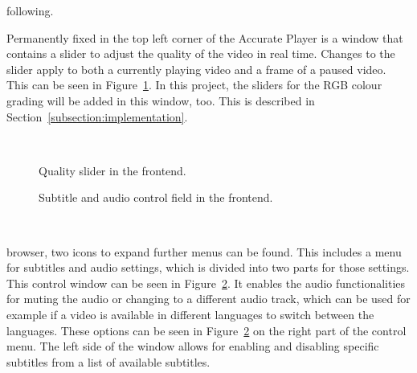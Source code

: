 \documentclass[../MasterThesis.tex]{subfiles}
\begin{document}
\begin{minipage}{0.5\textwidth}
%	
\vspace*{0.7em}
following.

	
Permanently fixed in the top left corner of the Accurate Player is a window that contains a slider to adjust the quality of the video in real time. Changes to the slider apply to both a currently playing video and a frame of a paused video. This can be seen in Figure~\ref{figure:qualityslider}. 
In this project, the sliders for the RGB colour grading will be added in this window, too. This is described in Section~\ref{subsection:implementation}.

\end{minipage}\begin{minipage}{0.05\textwidth}
	\ 
\end{minipage}\begin{minipage}{0.45\textwidth}
	
\begin{figure}[H]
	\begin{center}
		\caption[Quality slider in the frontend.]{Quality slider in the frontend.}
		\label{figure:qualityslider} 
	\end{center}
\end{figure}
\end{minipage}

\vspace*{0.2em}

\begin{minipage}{0.5\textwidth}
	\begin{figure}[H]
		\begin{center}
			\caption[Subtitle and audio control field in the frontend.]{Subtitle and audio control field in the frontend.}
			\label{figure:subtitles}
		\end{center}
	\end{figure}
\vfill
\end{minipage}\begin{minipage}{0.05\textwidth}
	\ 
\end{minipage}\begin{minipage}{0.45\textwidth}
browser, two icons to expand further menus can be found. 
This includes a menu for subtitles and audio settings, which is divided into two parts for those settings. This control window can be seen in Figure~\ref{figure:subtitles}. It enables the audio functionalities for muting the audio or changing to a different audio track, which can be used for example if a video is available in different languages to switch between the languages. These options can be seen in Figure~\ref{figure:subtitles} on the right part of the control menu.
The left side of the window allows for enabling and disabling specific subtitles from a list of available subtitles. 
%
%
\end{minipage}
\end{document}
